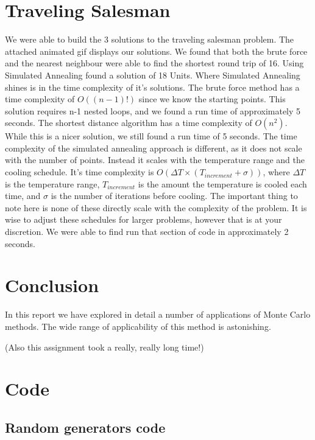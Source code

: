 \documentclass[twocolumn]{myarticle}
\begin{document}
\section{Traveling Salesman}
We were able to build the 3 solutions to the traveling salesman problem. 
The attached animated gif displays our solutions. 
We found that both the brute force and the nearest neighbour were able to find the shortest round trip of 16. 
Using Simulated Annealing found a solution of 18 Units. 
Where Simulated Annealing shines is in the time complexity of it's solutions. 
The brute force method has a time complexity of $O((n-1)!)$ since we know the starting points. 
This solution requires n-1 nested loops, and we found a run time of approximately 5 seconds. 
The shortest distance algorithm has a time complexity of $O(n^{2})$. 
While this is a nicer solution, we still found a run time of 5 seconds. 
The time complexity of the simulated annealing approach is different, as it does not scale with the number of points. 
Instead it scales with the temperature range and the cooling schedule. 
It's time complexity is $O(\Delta T \times (T_{increment} + \sigma))$, where $\Delta T$ is the temperature range, $T_{increment}$ is the amount the temperature is cooled each time, and $\sigma$ is the number of iterations before cooling. 
The important thing to note here is none of these directly scale with the complexity of the problem. 
It is wise to adjust these schedules for larger problems, however that is at your discretion. 
We were able to find run that section of code in approximately 2 seconds.

\section{Conclusion}
\label{sec:conclusion}

In this report we have explored in detail a number of applications of Monte Carlo methods.
The wide range of applicability of this method is astonishing.

(Also this assignment took a really, really long time!)

\onecolumn

\section{Code}
\label{sec:code}

\subsection{Random generators code}
\label{subsec:random_generators_code}
\end{document}
